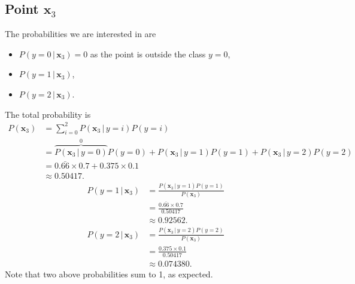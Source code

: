 \documentclass[10pt]{article}
\begin{document}
\subsection*{Point $\textbf{x}_3$}
The probabilities we are interested in are
\begin{itemize}
  \item $P(y = 0 \, | \, \textbf{x}_3) = 0$ as the point is outside the class $y = 0$,
  \item $P(y = 1 \, | \, \textbf{x}_3)$,
  \item $P(y = 2 \, | \, \textbf{x}_3)$.
\end{itemize}
The total probability is
\begin{align*}
P(\textbf{x}_3) &= \sum_{i = 0}^2 P(\textbf{x}_3 \, | \, y = i)P(y = i) \\
                    &= \overbrace{P(\textbf{x}_3 \, | \, y = 0)}^0 P(y = 0) + P(\textbf{x}_3 \, | \, y = 1)P(y = 1) + P(\textbf{x}_3 \, | \, y = 2)P(y = 2) \\
                    &= 0.\bar{66} \times 0.7 + 0.375 \times 0.1 \\
                    &\approx 0.50417.
\end{align*}
\begin{align*}
P(y = 1 \, | \, \textbf{x}_3) &= \frac{ P( \textbf{x}_3 \, | \, y = 1)P(y = 1)}{ P(\textbf{x}_3) } \\
                                          &= \frac{ 0.\bar{66} \times 0.7}{0.50417} \\
                                          &\approx 0.92562. \\
P(y = 2 \, | \, \textbf{x}_3) &= \frac{P(\textbf{x}_3 \, | \, y = 2)P(y = 2)}{P(\textbf{x}_3)} \\
                                          &= \frac{0.375 \times 0.1}{0.50417} \\
                                          &\approx 0.074380. 
\end{align*}
Note that two above probabilities sum to 1, as expected.
\end{document}
